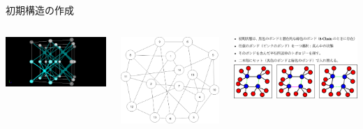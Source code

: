 \documentclass[12pt, dvipdfmx]{beamer}
\begin{document}
\begin{frame}
\begin{block}{初期構造の作成}
		\vspace{-1mm}
		\begin{columns}[T, onlytextwidth]
				\includegraphics[width=\textwidth]{8_per.png}
				\vspace{-5mm}
				\begin{center}
					\includegraphics[width=.6\textwidth]{Network.png}
				\end{center}
				\includegraphics[width=\textwidth]{bond_exchg.png}
		\end{columns}
	\end{block}
\end{frame}
\end{document}
